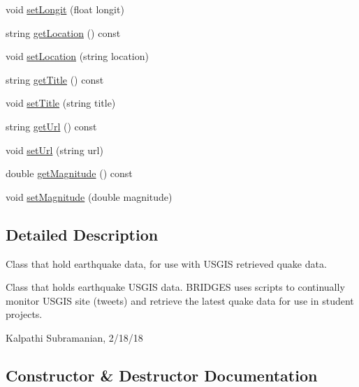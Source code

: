 \begin{DoxyCompactItemize}
void \hyperlink{classbridges_1_1_earthquake_u_s_g_s_a745dc27f3c68a3ae996ceb7771d89ec5}{set\+Longit} (float longit)
\item 
string \hyperlink{classbridges_1_1_earthquake_u_s_g_s_a63bf958e1ac2b6b4797c1733b33c4463}{get\+Location} () const 
\item 
void \hyperlink{classbridges_1_1_earthquake_u_s_g_s_a5dc533759cc900440d70bdfc68f16599}{set\+Location} (string location)
\item 
string \hyperlink{classbridges_1_1_earthquake_u_s_g_s_ab0ecd24e7a2679919b53d3fa27d7429c}{get\+Title} () const 
\item 
void \hyperlink{classbridges_1_1_earthquake_u_s_g_s_a78fe86dcb1bae8470d5ac58fdda2fe51}{set\+Title} (string title)
\item 
string \hyperlink{classbridges_1_1_earthquake_u_s_g_s_a0a82972d7f72a10fd5899dcc26715a9d}{get\+Url} () const 
\item 
void \hyperlink{classbridges_1_1_earthquake_u_s_g_s_ac07298c50e03955d167a2ca38c5150be}{set\+Url} (string url)
\item 
double \hyperlink{classbridges_1_1_earthquake_u_s_g_s_a4e28322b7c9585c7bf56876c52693565}{get\+Magnitude} () const 
\item 
void \hyperlink{classbridges_1_1_earthquake_u_s_g_s_aae8be6112f5c27c168c452261d9b29a2}{set\+Magnitude} (double magnitude)
\end{DoxyCompactItemize}


\subsection{Detailed Description}
Class that hold earthquake data, for use with U\+S\+G\+I\+S retrieved quake data. 

Class that holds earthquake U\+S\+G\+I\+S data. B\+R\+I\+D\+G\+E\+S uses scripts to continually monitor U\+S\+G\+I\+S site (tweets) and retrieve the latest quake data for use in student projects.

Kalpathi Subramanian, 2/18/18 

\subsection{Constructor \& Destructor Documentation}
\hypertarget{classbridges_1_1_earthquake_u_s_g_s_a540ae74c248da179fbbd182b843a14e0}{}
